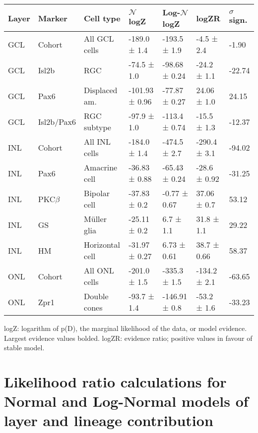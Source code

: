\begin{table}[!ht]
    \begin{tabular}{|l|l|l|l|l|l|l|} 
        \hline
        {\bf Layer} & {\bf Marker} & {\bf Cell type} & {\bf $\mathcal{N}$ logZ} & {\bf Log-$\mathcal{N}$ logZ} & {\bf logZR} & {\bf $\sigma$ sign.}\\ \hline \hline
        GCL & Cohort & All GCL cells & -189.0 ± 1.4 & -193.5 ± 1.9 & -4.5 ± 2.4 & -1.90\\ \hline \hline
        GCL & Isl2b & RGC & -74.5 ± 1.0 & -98.68 ± 0.24 & -24.2 ± 1.1 & -22.74\\ \hline
        GCL & Pax6 & Displaced am. & -101.93 ± 0.96 & -77.87 ± 0.27 & 24.06 ± 1.0 & 24.15\\ \hline
        GCL & Isl2b/Pax6 & RGC subtype & -97.9 ± 1.0 & -113.4 ± 0.74 & -15.5 ± 1.3 & -12.37\\ \hline \hline
        INL & Cohort & All INL cells & -184.0 ± 1.4 & -474.5 ± 2.7 & -290.4 ± 3.1 & -94.02\\ \hline \hline
        INL & Pax6 & Amacrine cell & -36.83 ± 0.88 & -65.43 ± 0.24 & -28.6 ± 0.92 & -31.25\\ \hline
        INL & PKC$\beta$ & Bipolar cell & -37.83 ± 0.2 & -0.77 ± 0.67 & 37.06 ± 0.7 & 53.12\\ \hline
        INL & GS & M\"{u}ller glia & -25.11 ± 0.2 & 6.7 ± 1.1 & 31.8 ± 1.1 & 29.22\\ \hline
        INL & HM & Horizontal cell & -31.97 ± 0.27 & 6.73 ± 0.61 & 38.7 ± 0.66 & 58.37\\ \hline \hline
        ONL & Cohort & All ONL cells & -201.0 ± 1.5 & -335.3 ± 1.5 & -134.2 ± 2.1 & -63.65\\ \hline \hline
        ONL & Zpr1 & Double cones & -93.7 ± 1.4 & -146.91 ± 0.8 & -53.2 ± 1.6 & -33.23\\ \hline
    \end{tabular}
   
    \begin{flushleft}logZ: logarithm of p(D), the marginal likelihood of the data, or model evidence.  Largest evidence values bolded. logZR: evidence ratio; positive values in favour of stable model.
    \end{flushleft}
    \label{lineage_nlnev}
\end{table}

\section{Likelihood ratio calculations for Normal and Log-Normal models of layer and lineage contribution}

